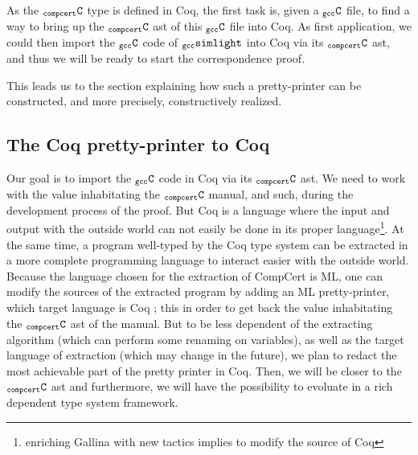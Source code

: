 \documentclass[a4paper, 11pt]{article}
\newcommand{\gccSL}{$_{\tt gcc}{\tt simlight}$\xspace}
\newcommand{\simgen}{{\tt simgen}\xspace}
\newcommand{\C}{$_{\tt compcert}{\tt C}$\xspace}
\newcommand{\gccC}{$_{\tt gcc}{\tt C}$\xspace}
\newcommand{\outworld}{the outside world\xspace}
\begin{document}
As the \C type is defined in Coq, the first task is, given a \gccC file, to find a way to bring up the \C ast of this \gccC file into Coq. As first application, we could then import the \gccC code of \gccSL into Coq via its \C ast, and thus we will be ready to start the correspondence proof.

This leads us to the section explaining how such a pretty-printer can be constructed, and more precisely, constructively realized.
\subsection{The Coq pretty-printer to Coq}
Our goal is to import the \gccC code in Coq via its \C ast. We need to work with the value inhabitating the \C manual, and such, during the development process of the proof. But Coq is a language where the input and output with \outworld can not easily be done in its proper language\footnote{enriching Gallina with new tactics implies to modify the source of Coq}. At the same time, a program well-typed by the Coq type system can be extracted in a more complete programming language to interact easier with \outworld. Because the language chosen for the extraction of CompCert is ML, one can modify the sources of the extracted program by adding an ML pretty-printer, which target language is Coq ; this in order to get back the value inhabitating the \C ast of the manual. But to be less dependent of the extracting algorithm (which can perform some renaming on variables), as well as the target language of extraction (which may change in the future), we plan to redact the most achievable part of the pretty printer in Coq. Then, we will be closer to the \C ast and furthermore, we will have the possibility to evoluate in a rich dependent type system framework. 
\end{document}
